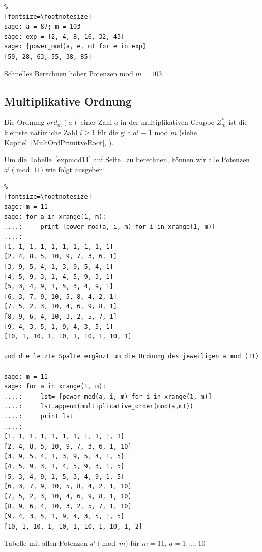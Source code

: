 \begin{refsegment}
\begin{sagecode}
\begin{Verbatim}%
[fontsize=\footnotesize]
sage: a = 87; m = 103
sage: exp = [2, 4, 8, 16, 32, 43]
sage: [power_mod(a, e, m) for e in exp]
[50, 28, 63, 55, 38, 85]
\end{Verbatim}
\caption{Schnelles Berechnen hoher Potenzen mod $m = 103$}
\end{sagecode}


\hypertarget{nt:AppArith3a1}{}
\subsection{Multiplikative Ordnung}
\label{nt:AppArith3a1}{}

Die Ordnung $ord_m(a)$ einer Zahl $a$ in der multiplikativen Gruppe $Z_m^*$ ist
die kleinste natürliche Zahl $i \ge 1$ für die gilt $a^i \equiv 1$ mod $m$
(siehe Kapitel~\ref{MultOrdPrimitveRoot}, \glqq {}\grqq).

Um die Tabelle~\ref{expmod11} auf Seite~\pageref{SrcArith3a} zu berechnen,
können wir alle Potenzen $a^i \pmod{11}$ wie folgt ausgeben:

\begin{sagecode}
\begin{Verbatim}%
[fontsize=\footnotesize]
sage: m = 11
sage: for a in xrange(1, m):
....:     print [power_mod(a, i, m) for i in xrange(1, m)]
....:
[1, 1, 1, 1, 1, 1, 1, 1, 1, 1]
[2, 4, 8, 5, 10, 9, 7, 3, 6, 1]
[3, 9, 5, 4, 1, 3, 9, 5, 4, 1]
[4, 5, 9, 3, 1, 4, 5, 9, 3, 1]
[5, 3, 4, 9, 1, 5, 3, 4, 9, 1]
[6, 3, 7, 9, 10, 5, 8, 4, 2, 1]
[7, 5, 2, 3, 10, 4, 6, 9, 8, 1]
[8, 9, 6, 4, 10, 3, 2, 5, 7, 1]
[9, 4, 3, 5, 1, 9, 4, 3, 5, 1]
[10, 1, 10, 1, 10, 1, 10, 1, 10, 1]

und die letzte Spalte ergänzt um die Ordnung des jeweiligen a mod (11)

sage: m = 11
sage: for a in xrange(1, m):
....:     lst= [power_mod(a, i, m) for i in xrange(1, m)]
....:     lst.append(multiplicative_order(mod(a,m)))
....:     print lst
....:
[1, 1, 1, 1, 1, 1, 1, 1, 1, 1, 1]
[2, 4, 8, 5, 10, 9, 7, 3, 6, 1, 10]
[3, 9, 5, 4, 1, 3, 9, 5, 4, 1, 5]
[4, 5, 9, 3, 1, 4, 5, 9, 3, 1, 5]
[5, 3, 4, 9, 1, 5, 3, 4, 9, 1, 5]
[6, 3, 7, 9, 10, 5, 8, 4, 2, 1, 10]
[7, 5, 2, 3, 10, 4, 6, 9, 8, 1, 10]
[8, 9, 6, 4, 10, 3, 2, 5, 7, 1, 10]
[9, 4, 3, 5, 1, 9, 4, 3, 5, 1, 5]
[10, 1, 10, 1, 10, 1, 10, 1, 10, 1, 2]
\end{Verbatim}
\caption{Tabelle mit allen Potenzen $a^i \pmod{m}$ für $m=11$, $a=1,...,10$}
\label{nt_Sage-code_MultOrder_expmod11}%
\end{sagecode}



\end{refsegment}

